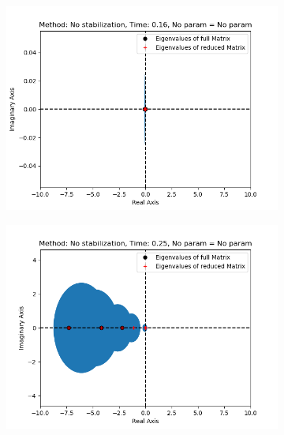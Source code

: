 \begin{figure}[ht]
     \centering
     \begin{subfigure}[h]{0.3\textwidth}
        \centering
        \includegraphics[width=\textwidth]{latex/Thesis/media/NoStab1.png}
     \end{subfigure}
     \hfill
     \begin{subfigure}[h]{0.3\textwidth}
        \centering
        \includegraphics[width=\textwidth]{latex/Thesis/media/NoStab2.png}
     \end{subfigure}
     \hfill
     \begin{subfigure}[h]{0.3\textwidth}

\end{subfigure}
\end{figure}
